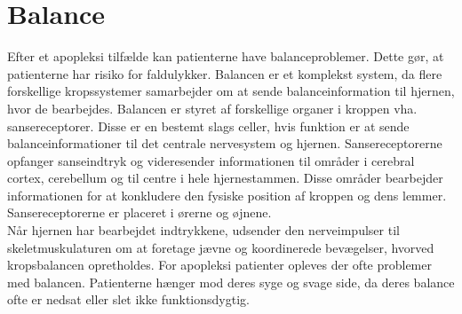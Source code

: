 \section{Balance}
Efter et apopleksi tilfælde kan patienterne have balanceproblemer. Dette gør, at patienterne har risiko for faldulykker. Balancen er et komplekst system, da flere forskellige kropssystemer samarbejder om at sende balanceinformation til hjernen, hvor de bearbejdes. Balancen er styret af forskellige organer i kroppen vha. sansereceptorer. Disse er en bestemt slags celler, hvis funktion er at sende balanceinformationer til det centrale nervesystem og hjernen. Sansereceptorerne opfanger sanseindtryk og videresender informationen til områder i cerebral cortex, cerebellum og til centre i hele hjernestammen. Disse områder bearbejder informationen for at konkludere den fysiske position af kroppen og dens lemmer. Sansereceptorerne er placeret i ørerne og øjnene. \cite{Martini2012}   \\
Når hjernen har bearbejdet indtrykkene, udsender den nerveimpulser til skeletmuskulaturen om at foretage jævne og koordinerede bevægelser, hvorved kropsbalancen opretholdes.\cite{Martini2012} For apopleksi patienter opleves der ofte problemer med balancen. Patienterne hænger mod deres syge og svage side, da deres balance ofte er nedsat eller slet ikke funktionsdygtig.\cite{Karnath2003}


